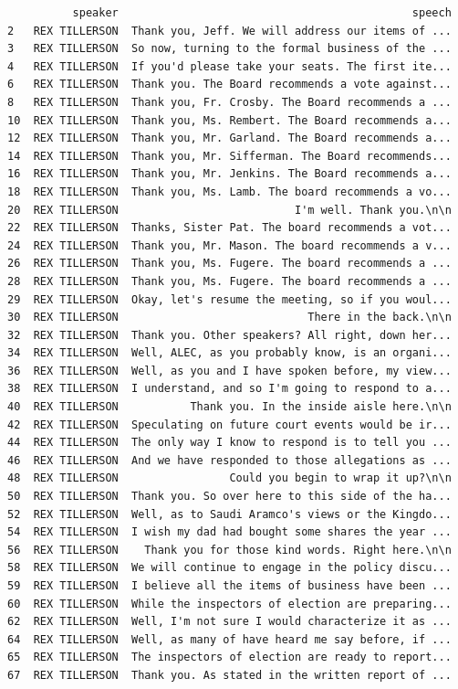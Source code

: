 \documentclass[
  letterpaper,
  DIV=11,
  numbers=noendperiod]{scrreprt}
\begin{document}
\begin{verbatim}
          speaker                                             speech
2   REX TILLERSON  Thank you, Jeff. We will address our items of ...
3   REX TILLERSON  So now, turning to the formal business of the ...
4   REX TILLERSON  If you'd please take your seats. The first ite...
6   REX TILLERSON  Thank you. The Board recommends a vote against...
8   REX TILLERSON  Thank you, Fr. Crosby. The Board recommends a ...
10  REX TILLERSON  Thank you, Ms. Rembert. The Board recommends a...
12  REX TILLERSON  Thank you, Mr. Garland. The Board recommends a...
14  REX TILLERSON  Thank you, Mr. Sifferman. The Board recommends...
16  REX TILLERSON  Thank you, Mr. Jenkins. The Board recommends a...
18  REX TILLERSON  Thank you, Ms. Lamb. The board recommends a vo...
20  REX TILLERSON                           I'm well. Thank you.\n\n
22  REX TILLERSON  Thanks, Sister Pat. The board recommends a vot...
24  REX TILLERSON  Thank you, Mr. Mason. The board recommends a v...
26  REX TILLERSON  Thank you, Ms. Fugere. The board recommends a ...
28  REX TILLERSON  Thank you, Ms. Fugere. The board recommends a ...
29  REX TILLERSON  Okay, let's resume the meeting, so if you woul...
30  REX TILLERSON                             There in the back.\n\n
32  REX TILLERSON  Thank you. Other speakers? All right, down her...
34  REX TILLERSON  Well, ALEC, as you probably know, is an organi...
36  REX TILLERSON  Well, as you and I have spoken before, my view...
38  REX TILLERSON  I understand, and so I'm going to respond to a...
40  REX TILLERSON           Thank you. In the inside aisle here.\n\n
42  REX TILLERSON  Speculating on future court events would be ir...
44  REX TILLERSON  The only way I know to respond is to tell you ...
46  REX TILLERSON  And we have responded to those allegations as ...
48  REX TILLERSON                 Could you begin to wrap it up?\n\n
50  REX TILLERSON  Thank you. So over here to this side of the ha...
52  REX TILLERSON  Well, as to Saudi Aramco's views or the Kingdo...
54  REX TILLERSON  I wish my dad had bought some shares the year ...
56  REX TILLERSON    Thank you for those kind words. Right here.\n\n
58  REX TILLERSON  We will continue to engage in the policy discu...
59  REX TILLERSON  I believe all the items of business have been ...
60  REX TILLERSON  While the inspectors of election are preparing...
62  REX TILLERSON  Well, I'm not sure I would characterize it as ...
64  REX TILLERSON  Well, as many of have heard me say before, if ...
65  REX TILLERSON  The inspectors of election are ready to report...
67  REX TILLERSON  Thank you. As stated in the written report of ...
\end{verbatim}
\end{document}
